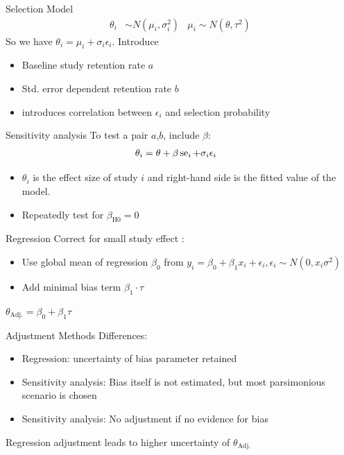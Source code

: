 \documentclass[english]{beamer}\usepackage[]{graphicx}\usepackage[]{color}
\begin{document}
\begin{frame}{Selection Model}
\citet{Copas2}
\begin{align}
\theta_i &\sim N(\mu_i, \sigma_i^2) &
\mu_i \sim N(\theta, \tau^2) \nonumber
\end{align}
So we have $\theta_i = \mu_i + \sigma_i\epsilon_i \nonumber$. Introduce
\begin{itemize}
\item Baseline study retention rate $a$
\item Std. error dependent retention rate $b$
\item introduces correlation between $\epsilon_i$ and selection probability
\end{itemize}
\end{frame}

\begin{frame}{Sensitivity analysis}
To test a pair $a$,$b$,	include $\beta$:
\begin{align}
\theta_i &= \theta + \beta \operatorname{se}_i + \sigma_i \epsilon_i \nonumber
\end{align}
\vspace{-10mm}
\begin{itemize}
\item $\theta_i$ is the effect size of study $i$ and right-hand side is the fitted 
value of the model. 
\item Repeatedly test for $\beta_{\textrm{H0}} = 0$ %
\end{itemize}
\end{frame}

\begin{frame}{Regression}
Correct for small study effect \citep{Limitmeta}:
\begin{itemize}
\item Use global mean of regression $\beta_0$ from $y_i = \beta_0 + \beta_1 x_i + \epsilon_i, \epsilon_i \sim N(0, x_i \sigma^2) \nonumber$
\item Add minimal bias term $\beta_1 \cdot \tau$
\end{itemize}
$\theta_{\textrm{Adj.}} = \beta_0 + \beta_1\tau$
\end{frame}

\begin{frame}{Adjustment Methods}
Differences:
\begin{itemize}
\item Regression: uncertainty of bias parameter retained
\item Sensitivity analysis: Bias itself is not estimated, but most parsimonious scenario is chosen
\item Sensitivity analysis: No adjustment if no evidence for bias
\end{itemize}
Regression adjustment leads to higher uncertainty of $\theta_{\textrm{Adj.}}$
\end{frame}
\end{document}
